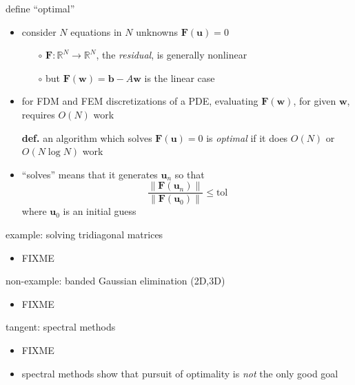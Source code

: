 \documentclass[hide notes,intlimits,usenames,dvipsnames]{beamer}
\newcommand{\RR}{\mathbb{R}}
\begin{document}
\begin{frame}{define ``optimal''}
\begin{itemize}
\item consider $N$ equations in $N$ unknowns $\mathbf{F}(\mathbf{u}) = 0$
	\begin{itemize}
	\item[$\circ$] $\mathbf{F}:\RR^N \to \RR^N$, the \emph{residual}, is generally nonlinear
	\item[$\circ$] but $\mathbf{F}(\mathbf{w}) = \mathbf{b} - A \mathbf{w}$ is the linear case
	\end{itemize}
\item for FDM and FEM discretizations of a PDE, evaluating $\mathbf{F}(\mathbf{w})$, for given $\mathbf{w}$, requires $O(N)$ work

\bigskip
\indent \item[\textbf{def.}]  an algorithm which solves $\mathbf{F}(\mathbf{u}) = 0$ is \emph{optimal} if it does $O(N)$ or $O(N\log N)$ work

\bigskip
\item  ``solves'' means that it generates $\mathbf{u}_n$ so that
	    $$\frac{\|\mathbf{F}(\mathbf{u}_n)\|}{\|\mathbf{F}(\mathbf{u}_0)\|} \le \text{tol}$$
where $\mathbf{u}_0$ is an initial guess
\end{itemize}
\end{frame}

\begin{frame}{example: solving tridiagonal matrices}
\begin{itemize}
\item FIXME
\end{itemize}
\end{frame}

\begin{frame}{non-example:  banded Gaussian elimination (2D,3D)}
\begin{itemize}
\item FIXME
\end{itemize}
\end{frame}

\begin{frame}{tangent: spectral methods}
\begin{itemize}
\item FIXME
\item spectral methods show that pursuit of optimality is \emph{not} the only good goal
\end{itemize}
\end{frame}
\end{document}

